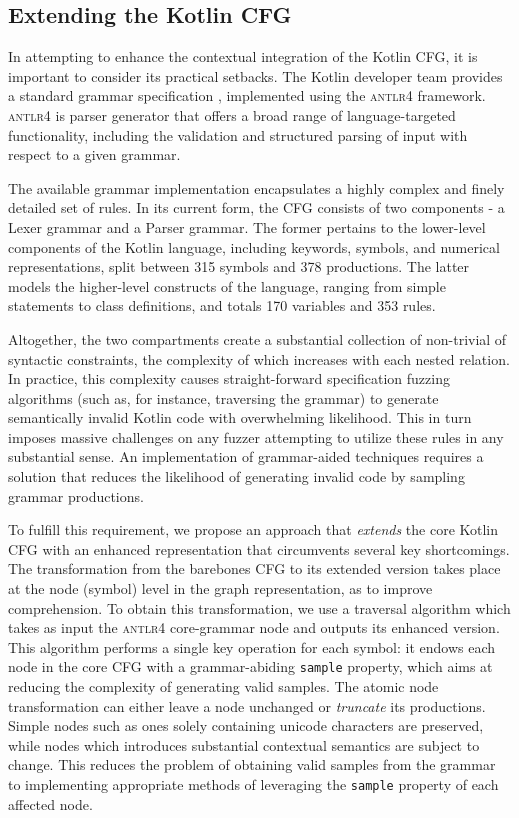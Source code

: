 \subsection{\label{subsec:extending-cfg} Extending the Kotlin CFG}

In attempting to enhance the contextual integration of the Kotlin \gls{CFG},
it is important to consider its practical setbacks.
The Kotlin developer team provides a standard grammar specification \cite{kotlingrammar},
implemented using the \textsc{antlr4} framework.
\textsc{antlr4} \cite{parr2013definitive} is parser generator that
offers a broad range of language-targeted functionality,
including the validation and structured parsing of input
with respect to a given grammar.

The available grammar implementation encapsulates a highly complex 
and finely detailed set of rules.
In its current form, the \gls{CFG} consists of two components - a Lexer grammar
and a Parser grammar.
The former pertains to the lower-level components of the Kotlin language, 
including keywords, symbols, and numerical representations, split between 315 
symbols and 378 productions.
The latter models the higher-level constructs of the language, ranging from
simple statements to class definitions, and totals 170 variables and 353 rules.

Altogether, the two compartments create a substantial collection of non-trivial
of syntactic constraints, the complexity of which increases with each nested
relation.
In practice, this complexity causes straight-forward specification fuzzing algorithms
(such as, for instance, traversing the grammar)
to generate semantically invalid Kotlin code with overwhelming likelihood.
This in turn imposes massive challenges on any fuzzer attempting to utilize these
rules in any substantial sense.
An implementation of grammar-aided techniques requires a
solution that reduces the likelihood of generating invalid code by sampling grammar productions.

To fulfill this requirement, we propose an approach that \textit{extends} the core
Kotlin \gls{CFG} with an enhanced representation that circumvents several key shortcomings.
The transformation from the barebones \gls{CFG} to its extended version takes place
at the node (symbol) level in  the graph representation, as to improve comprehension.
To obtain this transformation, we use a traversal algorithm which takes as input the
\textsc{antlr4} core-grammar node and outputs its enhanced version.
This algorithm performs a single key operation for each symbol:
it endows each node in the core \gls{CFG} with a grammar-abiding \texttt{sample} property,
which aims at reducing the complexity of generating valid samples.
The atomic node transformation can either leave a node unchanged or \textit{truncate} its
productions.
Simple nodes such as ones solely containing unicode characters are preserved, while
nodes which introduces substantial contextual semantics are subject to change.
This reduces the problem of obtaining valid samples from the grammar to implementing
appropriate methods of leveraging the \texttt{sample} property of each affected node.

